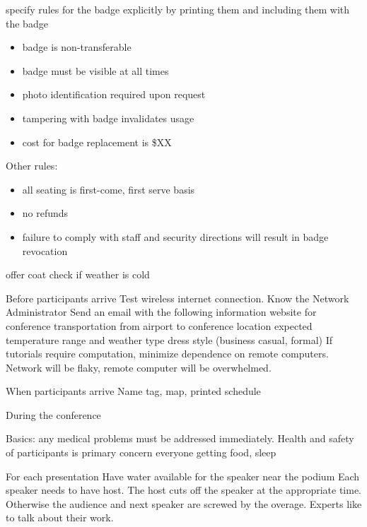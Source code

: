 specify rules for the badge explicitly by printing them and including them with the badge
\begin{itemize}
\item badge is non-transferable
\item badge must be visible at all times
\item photo identification required upon request
\item tampering with badge invalidates usage
\item cost for badge replacement is \$XX
\end{itemize}
Other rules:
\begin{itemize}
\item all seating is first-come, first serve basis
\item no refunds
\item failure to comply with staff and security directions will result in badge revocation
\end{itemize}
offer coat check if weather is cold



Before participants arrive
Test wireless internet connection. Know the Network Administrator
Send an email with the following information
website for conference
transportation from airport to conference location
expected temperature range and weather type
dress style (business casual, formal)
If tutorials require computation, minimize dependence on remote computers. Network will be flaky, remote computer will be overwhelmed.

When participants arrive
Name tag, map, printed schedule

During the conference

Basics:
any medical problems must be addressed immediately. Health and safety of participants is primary concern
everyone getting food, sleep


For each presentation
Have water available for the speaker near the podium
Each speaker needs to have host. The host cuts off the speaker at the appropriate time. Otherwise the audience and next speaker are screwed by the overage. Experts like to talk about their work.

